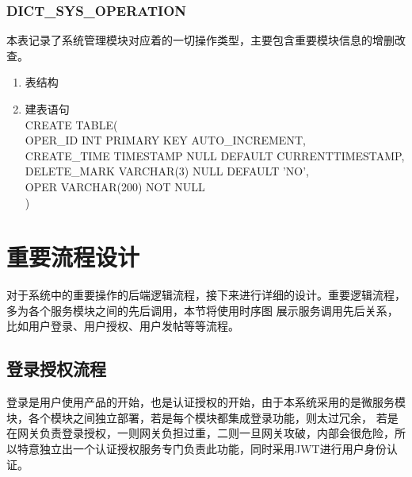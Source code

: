 \subsubsection{DICT\_SYS\_OPERATION}
本表记录了系统管理模块对应着的一切操作类型，主要包含重要模块信息的增删改查。
\begin{enumerate}
    \item 表结构
    \begin{table}[htbp]
        \centering
        \end{table}
    \item 建表语句\\
        CREATE TABLE(\\
            OPER\_ID INT PRIMARY KEY AUTO\_INCREMENT,\\
            CREATE\_TIME TIMESTAMP NULL DEFAULT CURRENTTIMESTAMP,\\
            DELETE\_MARK VARCHAR(3) NULL DEFAULT 'NO',\\
            OPER VARCHAR(200) NOT NULL \\
        )
    \end{enumerate}

\section{重要流程设计}
对于系统中的重要操作的后端逻辑流程，接下来进行详细的设计。重要逻辑流程，多为各个服务模块之间的先后调用，本节将使用时序图
展示服务调用先后关系，比如用户登录、用户授权、用户发帖等等流程。

\subsection{登录授权流程}
登录是用户使用产品的开始，也是认证授权的开始，由于本系统采用的是微服务模块，各个模块之间独立部署，若是每个模块都集成登录功能，则太过冗余，
若是在网关负责登录授权，一则网关负担过重，二则一旦网关攻破，内部会很危险，所以特意独立出一个认证授权服务专门负责此功能，同时采用JWT进行用户身份认证。

